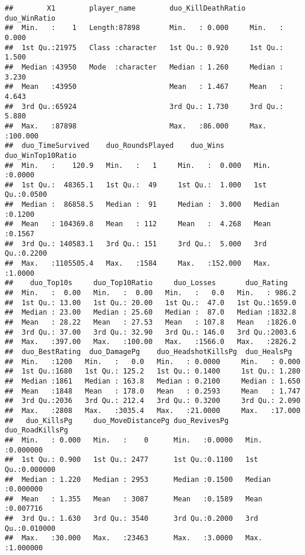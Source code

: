 \documentclass[]{article}
\begin{document}
\begin{verbatim}
##        X1        player_name        duo_KillDeathRatio  duo_WinRatio    
##  Min.   :    1   Length:87898       Min.   : 0.000     Min.   :  0.000  
##  1st Qu.:21975   Class :character   1st Qu.: 0.920     1st Qu.:  1.500  
##  Median :43950   Mode  :character   Median : 1.260     Median :  3.230  
##  Mean   :43950                      Mean   : 1.467     Mean   :  4.643  
##  3rd Qu.:65924                      3rd Qu.: 1.730     3rd Qu.:  5.880  
##  Max.   :87898                      Max.   :86.000     Max.   :100.000  
##  duo_TimeSurvived    duo_RoundsPlayed    duo_Wins       duo_WinTop10Ratio
##  Min.   :    120.9   Min.   :   1     Min.   :  0.000   Min.   :0.0000   
##  1st Qu.:  48365.1   1st Qu.:  49     1st Qu.:  1.000   1st Qu.:0.0500   
##  Median :  86858.5   Median :  91     Median :  3.000   Median :0.1200   
##  Mean   : 104369.8   Mean   : 112     Mean   :  4.268   Mean   :0.1567   
##  3rd Qu.: 140583.1   3rd Qu.: 151     3rd Qu.:  5.000   3rd Qu.:0.2200   
##  Max.   :1105505.4   Max.   :1584     Max.   :152.000   Max.   :1.0000   
##    duo_Top10s     duo_Top10Ratio     duo_Losses       duo_Rating    
##  Min.   :  0.00   Min.   :  0.00   Min.   :   0.0   Min.   : 986.2  
##  1st Qu.: 13.00   1st Qu.: 20.00   1st Qu.:  47.0   1st Qu.:1659.0  
##  Median : 23.00   Median : 25.60   Median :  87.0   Median :1832.8  
##  Mean   : 28.22   Mean   : 27.53   Mean   : 107.8   Mean   :1826.0  
##  3rd Qu.: 37.00   3rd Qu.: 32.90   3rd Qu.: 146.0   3rd Qu.:2003.6  
##  Max.   :397.00   Max.   :100.00   Max.   :1566.0   Max.   :2826.2  
##  duo_BestRating  duo_DamagePg    duo_HeadshotKillsPg  duo_HealsPg    
##  Min.   :1200   Min.   :   0.0   Min.   : 0.0000     Min.   : 0.000  
##  1st Qu.:1680   1st Qu.: 125.2   1st Qu.: 0.1400     1st Qu.: 1.280  
##  Median :1861   Median : 163.8   Median : 0.2100     Median : 1.650  
##  Mean   :1848   Mean   : 178.0   Mean   : 0.2593     Mean   : 1.747  
##  3rd Qu.:2036   3rd Qu.: 212.4   3rd Qu.: 0.3200     3rd Qu.: 2.090  
##  Max.   :2808   Max.   :3035.4   Max.   :21.0000     Max.   :17.000  
##   duo_KillsPg     duo_MoveDistancePg duo_RevivesPg    duo_RoadKillsPg   
##  Min.   : 0.000   Min.   :    0      Min.   :0.0000   Min.   :0.000000  
##  1st Qu.: 0.900   1st Qu.: 2477      1st Qu.:0.1100   1st Qu.:0.000000  
##  Median : 1.220   Median : 2953      Median :0.1500   Median :0.000000  
##  Mean   : 1.355   Mean   : 3087      Mean   :0.1589   Mean   :0.007716  
##  3rd Qu.: 1.630   3rd Qu.: 3540      3rd Qu.:0.2000   3rd Qu.:0.010000  
##  Max.   :30.000   Max.   :23463      Max.   :3.0000   Max.   :1.000000  

\end{verbatim}
\end{document}

